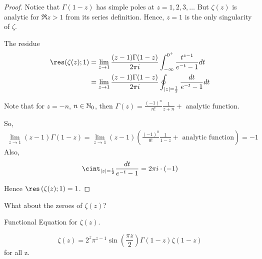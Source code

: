 \documentclass[a4paper]{article}
\begin{document}
\begin{proof}
	Notice that $\Gamma(1-z)$ has simple poles at $z = 1,2,3,\ldots$
	But $\zeta(z) $ is analytic for $\Re z > 1$ from its series definition. Hence, $z=1$ is the only singularity of $\zeta$.

	The residue
	\begin{align*}
		\res(\zeta(z); 1) &= \lim_{z\to 1} \frac{(z-1) \Gamma(1-z)}{2\pi i} \int_{-\infty}^{0^{+}} \frac{t^{z-1}}{e^{-t} - 1} dt \\
		&= \lim_{z\to 1} \frac{(z-1)\Gamma(1-z)}{2\pi i} \oint_{|z| = \frac{1}{2}} \frac{dt}{e^{-t} - 1} dt
	\end{align*}

	Note that for $z = -n$, $n \in \mathbb{N}_0$, then $\Gamma(z) = \frac{(-1)^{n}}{n!} \frac{1}{z+n} + \text{ analytic function}$.

	So,
	\begin{align*}
		\lim_{z\to 1} (z-1) \Gamma(1-z) = \lim_{z\to 1} (z-1) \left( \frac{(-1)^{0}}{0!} \frac{1}{1-z} + \text{ analytic function} \right) = -1
	\end{align*}
	Also,
	\[
		\cint_{|z|=\frac{1}{2}} \frac{dt}{e^{-t} - 1} = 2\pi i \cdot  (-1)
	\]

	Hence $\res\left( \zeta(z) ; 1 \right) = 1$. 
\end{proof}

What about the zeroes of $\zeta(z)$? 

\begin{prop}
	Functional Equation for $\zeta(z)$.

	 \[
		 \zeta(z) = 2^{z} \pi^{z-1} \sin\left( \frac{\pi z}{2} \right) \Gamma(1-z) \zeta(1-z)
	 \] for all z.
\end{prop}
\end{document}
